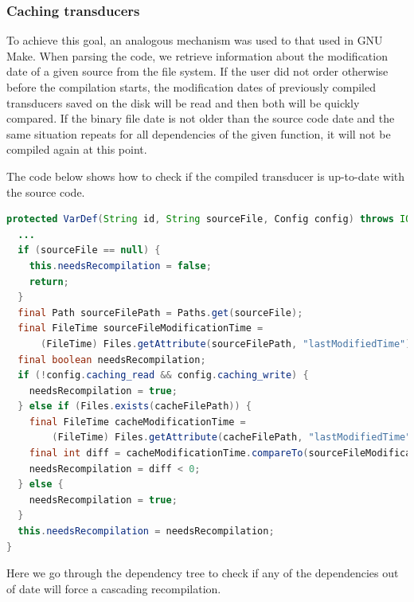 \hypertarget{caching-transducers}{%
\subsubsection{Caching transducers}\label{caching-transducers}}

To achieve this goal, an analogous mechanism was used to that used in
GNU Make. When parsing the code, we retrieve information about the
modification date of a given source from the file system. If the user
did not order otherwise before the compilation starts, the modification
dates of previously compiled transducers saved on the disk will be read
and then both will be quickly compared. If the binary file date is not
older than the source code date and the same situation repeats for all
dependencies of the given function, it will not be compiled again at
this point.

The code below shows how to check if the compiled transducer is
up-to-date with the source code.

\begin{lstlisting}[language=Java, frame=single]
protected VarDef(String id, String sourceFile, Config config) throws IOException {
  ...
  if (sourceFile == null) {
    this.needsRecompilation = false;
    return;
  }
  final Path sourceFilePath = Paths.get(sourceFile);
  final FileTime sourceFileModificationTime =
      (FileTime) Files.getAttribute(sourceFilePath, "lastModifiedTime");
  final boolean needsRecompilation;
  if (!config.caching_read && config.caching_write) {
    needsRecompilation = true;
  } else if (Files.exists(cacheFilePath)) {
    final FileTime cacheModificationTime =
        (FileTime) Files.getAttribute(cacheFilePath, "lastModifiedTime");
    final int diff = cacheModificationTime.compareTo(sourceFileModificationTime);
    needsRecompilation = diff < 0;
  } else {
    needsRecompilation = true;
  }
  this.needsRecompilation = needsRecompilation;
}
\end{lstlisting}

Here we go through the dependency tree to check if any of the
dependencies out of date will force a cascading recompilation. 

